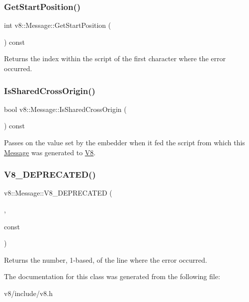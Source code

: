 \subsubsection{\texorpdfstring{Get\+Start\+Position()}{GetStartPosition()}}
{\footnotesize\ttfamily int v8\+::\+Message\+::\+Get\+Start\+Position (\begin{DoxyParamCaption}{ }\end{DoxyParamCaption}) const}

Returns the index within the script of the first character where the error occurred. \mbox{\label{classv8_1_1Message_a60e48ec814c324c443043dfaf366590a}} 
\subsubsection{\texorpdfstring{Is\+Shared\+Cross\+Origin()}{IsSharedCrossOrigin()}}
{\footnotesize\ttfamily bool v8\+::\+Message\+::\+Is\+Shared\+Cross\+Origin (\begin{DoxyParamCaption}{ }\end{DoxyParamCaption}) const}

Passes on the value set by the embedder when it fed the script from which this \mbox{\hyperlink{classv8_1_1Message}{Message}} was generated to \mbox{\hyperlink{classv8_1_1V8}{V8}}. \mbox{\label{classv8_1_1Message_acccd9c74f89e9951037c2e602703b57d}} 
\subsubsection{\texorpdfstring{V8\+\_\+\+D\+E\+P\+R\+E\+C\+A\+T\+E\+D()}{V8\_DEPRECATED()}}
{\footnotesize\ttfamily v8\+::\+Message\+::\+V8\+\_\+\+D\+E\+P\+R\+E\+C\+A\+T\+ED (\begin{DoxyParamCaption}\item[{\char`\"{}Use maybe version\char`\"{}}]{,  }\item[{int Get\+Line\+Number()}]{const }\end{DoxyParamCaption})}

Returns the number, 1-\/based, of the line where the error occurred. 

The documentation for this class was generated from the following file\+:\begin{DoxyCompactItemize}
\item 
v8/include/v8.\+h\end{DoxyCompactItemize}
